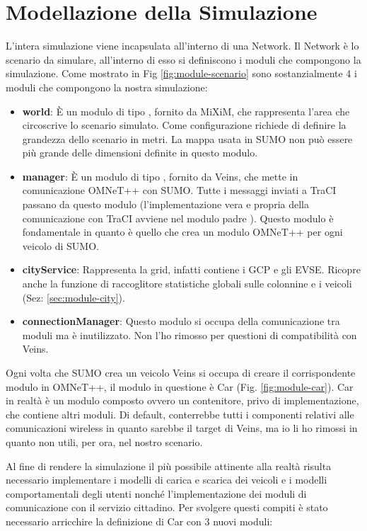 \section{Modellazione della Simulazione}

L'intera simulazione viene incapsulata all'interno di una Network. Il Network è lo scenario da simulare, all'interno di esso si definiscono i moduli che compongono la simulazione. Come mostrato in Fig \ref{fig:module-scenario} sono sostanzialmente 4 i moduli che compongono la nostra simulazione:

\begin{itemize}
	\item \textbf{world}: È un modulo di tipo , fornito da MiXiM, che rappresenta l'area che circoscrive lo scenario simulato. Come configurazione richiede di definire la grandezza dello scenario in metri. La mappa usata in SUMO non può essere più grande delle dimensioni definite in questo modulo.
	\item \textbf{manager}: È un modulo di tipo , fornito da Veins, che mette in comunicazione OMNeT++ con SUMO. Tutte i messaggi inviati a TraCI passano da questo modulo (l'implementazione vera e propria della comunicazione con TraCI avviene nel modulo padre ). Questo modulo è fondamentale in quanto è quello che crea un modulo OMNeT++ per ogni veicolo di SUMO.
	\item \textbf{cityService}: Rappresenta la grid, infatti contiene i GCP e gli EVSE. Ricopre anche la funzione di raccoglitore statistiche globali sulle colonnine e i veicoli (Sez: \ref{sec:module-city}).
	\item \textbf{connectionManager}: Questo modulo si occupa della comunicazione tra moduli ma è inutilizzato. Non l'ho rimosso per questioni di compatibilità con Veins.
\end{itemize}

Ogni volta che SUMO crea un veicolo Veins si occupa di creare il corrispondente modulo in OMNeT++, il modulo in questione è Car (Fig. \ref{fig:module-car}). Car in realtà è un modulo composto ovvero un contenitore, privo di implementazione, che contiene altri moduli. Di default, conterrebbe tutti i componenti relativi alle comunicazioni wireless in quanto sarebbe il target di Veins, ma io li ho rimossi in quanto non utili, per ora, nel nostro scenario.

Al fine di rendere la simulazione il più possibile attinente alla realtà risulta necessario implementare i modelli di carica e scarica dei veicoli e i modelli comportamentali degli utenti nonché l'implementazione dei moduli di comunicazione con il servizio cittadino. Per svolgere questi compiti è stato necessario arricchire la definizione di Car con 3 nuovi moduli:

